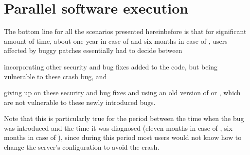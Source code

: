 



\section{Parallel software execution}

The bottom line for all the scenarios presented hereinbefore is that for
significant amount of time, \ie about one year in case of \lighttpd and six
months in case of \redis, users affected by buggy patches essentially had
to decide between%
\begin{inparaenum}[(1)]
\item incorporating other security and bug fixes added to the code, but being
  vulnerable to these crash bug, and
\item giving up on these security and bug fixes and using an old version of
  \lighttpd or \redis, which are not vulnerable to these newly introduced bugs.
\end{inparaenum}
Note that this is particularly true for the period between the time when the
bug was introduced and the time it was diagnosed (\ie eleven months in case of
\lighttpd, six months in case of \redis), since during this period most users
would not know how to change the server's configuration to avoid the crash.

